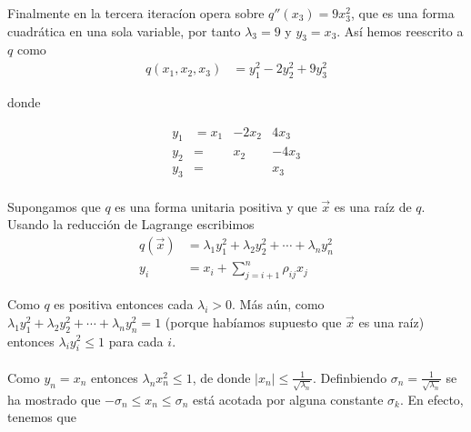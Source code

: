 \begin{example}
Finalmente en la tercera iteracíon opera sobre $q''\left(x_{3}\right) = 9x_{3}^{2}$, que es una forma cuadrática en una sola variable, por tanto $\lambda_{3} = 9$ y $y_{3} = x_{3}$. Así hemos reescrito a $q$ como 
\begin{equation*}
\begin{split}
q\left(x_{1}, x_{2}, x_{3}\right) & = y_{1}^{2} - 2y_{2}^{2} + 9y_{3}^{2}
\end{split}
\end{equation*}

donde 

\begin{equation*}
\begin{matrix}
y_{1} & =   x_{1}	& - 2x_{2}	&    4x_{3}\\
y_{2} & =		&     x_{2}	&  - 4x_{3}\\
y_{3} & =		&              	&      x_{3}
\end{matrix} 
\end{equation*}

\end{example}

\paragraph{}
Supongamos que $q$ es una forma unitaria positiva y que $\overrightarrow{x}$ es una raíz de $q$. Usando la reducción de Lagrange escribimos
\begin{equation*}
\begin{split}
q\left(\overrightarrow{x}\right) & =\lambda_{1}y_{1}^{2} + \lambda_{2}y_{2}^{2} + \cdots + \lambda_{n}y_{n}^{2}\\
y_{i} & = x_{i} + \sum_{j=i+1}^{n}\rho_{ij}x_{j}
\end{split}
\end{equation*}

Como $q$ es positiva entonces cada $\lambda_{i} > 0$. Más aún, como $\lambda_{1}y_{1}^{2} + \lambda_{2}y_{2}^{2} + \cdots + \lambda_{n}y_{n}^{2} = 1$ (porque habíamos supuesto que $\overrightarrow{x}$ es una raíz) entonces $\lambda_{i}y_{i}^{2} \leq 1$ para cada $i$.

\paragraph{}
Como $y_{n} = x_{n}$ entonces $\lambda_{n}x_{n}^{2} \leq 1$, de donde $|x_{n}| \leq \frac{1}{\sqrt{\lambda_{n}}}$. Definbiendo $\sigma_{n}=\frac{1}{\sqrt{\lambda_{n}}}$ se ha mostrado que $-\sigma_{n} \leq x_{n} \leq \sigma_{n}$ está acotada por alguna constante $\sigma_{k}$. En efecto, tenemos que 

